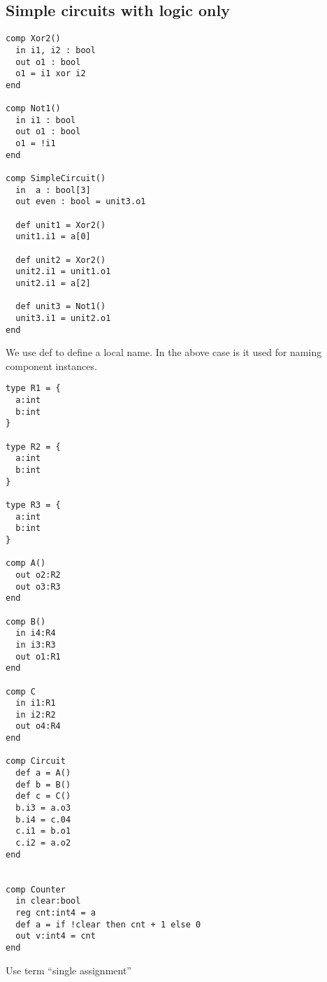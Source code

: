 \subsection{Simple circuits with logic only}

\shdl\lstset{}
\begin{lstlisting}[]
comp Xor2()
  in i1, i2 : bool
  out o1 : bool
  o1 = i1 xor i2
end

comp Not1()
  in i1 : bool
  out o1 : bool
  o1 = !i1
end

comp SimpleCircuit()
  in  a : bool[3] 
  out even : bool = unit3.o1

  def unit1 = Xor2()          
  unit1.i1 = a[0] 
     
  def unit2 = Xor2()
  unit2.i1 = unit1.o1
  unit2.i1 = a[2]          
 
  def unit3 = Not1()         
  unit3.i1 = unit2.o1
end
\end{lstlisting}

We use def to define a local name. In the above case is it used for naming component instances.

\shdl\lstset{}
\begin{lstlisting}[]
type R1 = {
  a:int
  b:int
}

type R2 = {
  a:int
  b:int
}

type R3 = {
  a:int
  b:int
}

comp A()
  out o2:R2
  out o3:R3
end

comp B()
  in i4:R4
  in i3:R3
  out o1:R1
end

comp C
  in i1:R1
  in i2:R2
  out o4:R4
end

comp Circuit
  def a = A()
  def b = B()
  def c = C()
  b.i3 = a.o3
  b.i4 = c.04
  c.i1 = b.o1
  c.i2 = a.o2
end


comp Counter
  in clear:bool
  reg cnt:int4 = a 
  def a = if !clear then cnt + 1 else 0
  out v:int4 = cnt
end
\end{lstlisting}


Use term “single assignment”
